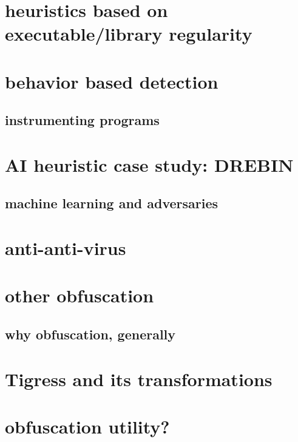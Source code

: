 \section{heuristics based on executable/library regularity}


\section{behavior based detection}


\subsection{instrumenting programs}


\section{AI heuristic case study: DREBIN}


\subsection{machine learning and adversaries}


\section{anti-anti-virus}




\section{other obfuscation}
\subsection{why obfuscation, generally}


\section{Tigress and its transformations}


\section{obfuscation utility?}


